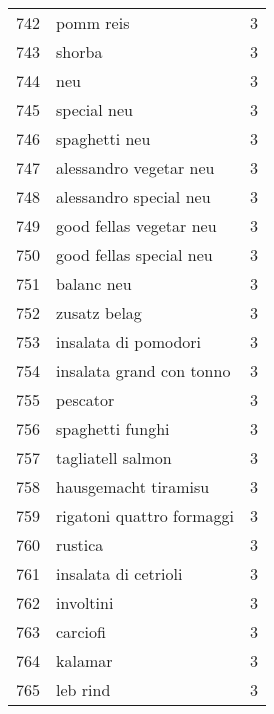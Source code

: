 \begin{tabular}{llr}
742  &                                          pomm reis &      3 \\
743  &                                             shorba &      3 \\
744  &                                                neu &      3 \\
745  &                                        special neu &      3 \\
746  &                                      spaghetti neu &      3 \\
747  &                             alessandro vegetar neu &      3 \\
748  &                             alessandro special neu &      3 \\
749  &                            good fellas vegetar neu &      3 \\
750  &                            good fellas special neu &      3 \\
751  &                                         balanc neu &      3 \\
752  &                                       zusatz belag &      3 \\
753  &                               insalata di pomodori &      3 \\
754  &                           insalata grand con tonno &      3 \\
755  &                                           pescator &      3 \\
756  &                                   spaghetti funghi &      3 \\
757  &                                  tagliatell salmon &      3 \\
758  &                               hausgemacht tiramisu &      3 \\
759  &                          rigatoni quattro formaggi &      3 \\
760  &                                            rustica &      3 \\
761  &                               insalata di cetrioli &      3 \\
762  &                                          involtini &      3 \\
763  &                                           carciofi &      3 \\
764  &                                            kalamar &      3 \\
765  &                                           leb rind &      3 \\

\end{tabular}
